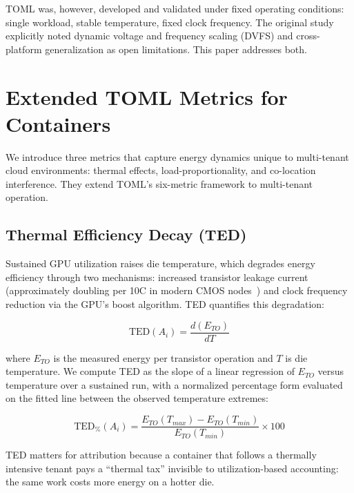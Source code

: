 \documentclass[conference]{IEEEtran}
\begin{document}
TOML was, however, developed and validated under fixed operating conditions: single workload, stable temperature, fixed clock frequency. The original study~\cite{syed2026toml} explicitly noted dynamic voltage and frequency scaling (DVFS) and cross-platform generalization as open limitations. This paper addresses both.


\section{Extended TOML Metrics for Containers}
\label{sec:metrics}

We introduce three metrics that capture energy dynamics unique to multi-tenant cloud environments: thermal effects, load-proportionality, and co-location interference. They extend TOML's six-metric framework to multi-tenant operation.

\subsection{Thermal Efficiency Decay (TED)}

Sustained GPU utilization raises die temperature, which degrades energy efficiency through two mechanisms: increased transistor leakage current (approximately doubling per 10\textdegree C in modern CMOS nodes~\cite{rabaey2003}) and clock frequency reduction via the GPU's boost algorithm. TED quantifies this degradation:

\begin{equation}
\text{TED}(A_i) = \frac{d(E_{TO})}{dT}
\label{eq:ted}
\end{equation}

where $E_{TO}$ is the measured energy per transistor operation and $T$ is die temperature. We compute TED as the slope of a linear regression of $E_{TO}$ versus temperature over a sustained run, with a normalized percentage form evaluated on the fitted line between the observed temperature extremes:

\begin{equation}
\text{TED}_{\%}(A_i) = \frac{E_{TO}(T_{max}) - E_{TO}(T_{min})}{E_{TO}(T_{min})} \times 100
\label{eq:ted_pct}
\end{equation}

TED matters for attribution because a container that follows a thermally intensive tenant pays a ``thermal tax'' invisible to utilization-based accounting: the same work costs more energy on a hotter die.
\end{document}
